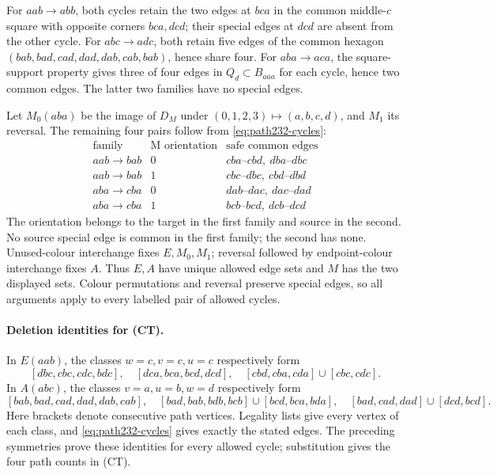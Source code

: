 For $aab\to abb$, both cycles retain the two edges at $bca$ in the
common middle-$c$ square with opposite corners $bca,dcd$; their
special edges at $dcd$ are absent from the other cycle. For
$abc\to adc$, both retain five edges of the common hexagon
$(bab,bad,cad,dad,dab,cab,bab)$, hence share four. For
$aba\to aca$, the square-support property gives three of four
edges in $Q_d\subset B_{aaa}$ for each cycle, hence two common edges.
The latter two families have no special edges.

Let $M_0(aba)$ be the image of $D_M$ under
$(0,1,2,3)\mapsto(a,b,c,d)$, and $M_1$ its reversal.
The remaining four pairs follow from \eqref{eq:path232-cycles}:
\[
\begin{array}{c|c|l}
\text{family}&\text{M orientation}&\text{safe common edges}\\\hline
aab\to bab&0&cba\text{--}cbd,\ dba\text{--}dbc\\
aab\to bab&1&cbc\text{--}dbc,\ cbd\text{--}dbd\\
aba\to cba&0&dab\text{--}dac,\ dac\text{--}dad\\
aba\to cba&1&bcb\text{--}bcd,\ dcb\text{--}dcd
\end{array}                                                     \tag{MP}
\]
The orientation belongs to the target in the first family and source
in the second. No source special edge is common in the first family;
the second has none. Unused-colour interchange fixes $E,M_0,M_1$;
reversal followed by endpoint-colour interchange fixes $A$. Thus
$E,A$ have unique allowed edge sets and $M$ has the two displayed
sets. Colour permutations and reversal preserve special edges, so
all arguments apply to every labelled pair of allowed cycles.

\paragraph{Deletion identities for (CT).}
In $E(aab)$, the classes $w=c,v=c,u=c$ respectively form
\[
[dbc,cbc,cdc,bdc],\quad[dca,bca,bcd,dcd],\quad
[cbd,cba,cda]\cup[cbc,cdc].
\]
In $A(abc)$, the classes $v=a,u=b,w=d$ respectively form
\[
[bab,bad,cad,dad,dab,cab],\quad
[bad,bab,bdb,bcb]\cup[bcd,bca,bda],\quad
[bad,cad,dad]\cup[dcd,bcd].
\]
Here brackets denote consecutive path vertices. Legality lists give
every vertex of each class, and \eqref{eq:path232-cycles} gives exactly
the stated edges. The preceding symmetries prove these identities for
every allowed cycle; substitution gives the four path counts in (CT).


